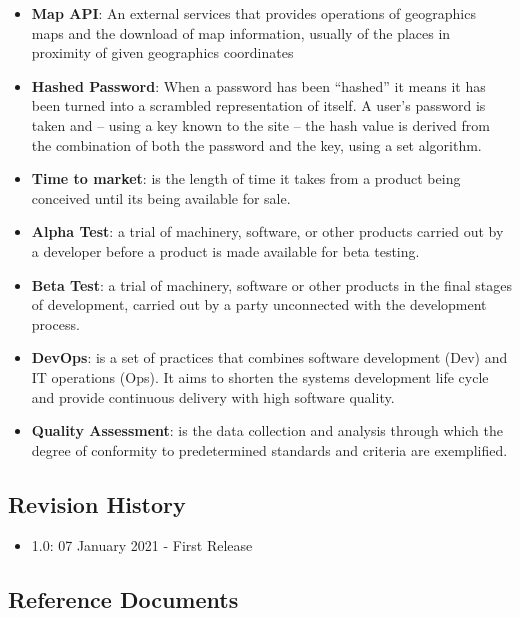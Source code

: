 \begin{itemize}
    \item \textbf{Map API}: An external services that provides operations of geographics maps and the download of map information, usually of the places in proximity of given geographics coordinates
    \item \textbf{Hashed Password}: When a password has been “hashed” it means it has been turned into a scrambled representation of itself. A user's password is taken and – using a key known to the site – the hash value is derived from the combination of both the password and the key, using a set algorithm.
    \item \textbf{Time to market}: is the length of time it takes from a product being conceived until its being available for sale.
    \item \textbf{Alpha Test}: a trial of machinery, software, or other products carried out by a developer before a product is made available for beta testing.
    \item \textbf{Beta Test}: a trial of machinery, software or other products in the final stages of development, carried out by a party unconnected with the development process.
    \item \textbf{DevOps}: is a set of practices that combines software development (Dev) and IT operations (Ops). It aims to shorten the systems development life cycle and provide continuous delivery with high software quality.
    \item \textbf{Quality Assessment}: is the data collection and analysis through which the degree of conformity to predetermined standards and criteria are exemplified.
\end{itemize}

\subsection{Revision History}

\begin{itemize}
    \item 1.0: 07 January 2021 - First Release
\end{itemize}

\subsection{Reference Documents}


